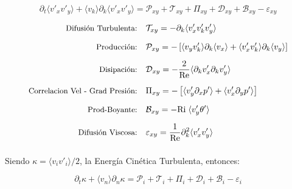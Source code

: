 \newpage 

\begin{equation}
\partial_t \langle v'_x v'_y \rangle + \langle v_k \rangle \partial_k \langle v'_x v'_y \rangle = \mathcal{P}_{xy} + \mathcal{T}_{xy} + \Pi_{xy} + \mathcal{D}_{xy} + \mathcal{B}_{xy} - \varepsilon_{xy}
\end{equation}

\vspace*{-1cm}

\begin{equation}
\begin{aligned}
\mbox{\small Difusión Turbulenta:}\quad 
& \mathcal{T}_{xy} = - \partial_k \langle v'_x v'_k v'_y \rangle \\[2mm]
\mbox{\small Producción:}\quad 
& \mathcal{P}_{xy} = - \left[ \langle v_y v'_k \rangle \partial_k \langle v_x \rangle + \langle v'_x v'_k \rangle \partial_k \langle v_y \rangle \right]  \\[2mm]
\mbox{\small Disipación:}\quad 
& \mathcal{D}_{xy} = - \frac{2}{\text{Re}} \langle \partial_k v'_x \partial_k v'_y \rangle \\[2mm]
\mbox{\small Correlacion Vel - Grad Presión:}\quad 
& \Pi_{xy} = - \left[ \langle v'_y \partial_x p' \rangle + \langle v'_x \partial_y p' \rangle \right]  \\[2mm]
\mbox{\small Prod-Boyante:}\quad 
& \mathcal{B}_{xy} = - \text{Ri} \hspace{1mm} \langle v'_y \theta' \rangle \\[2mm]
\mbox{\small Difusión Viscosa:}\quad 
& \varepsilon_{xy} = \frac{1}{\text{Re}} \partial^2_k \langle v'_x v'_y \rangle \\[2mm]
\end{aligned}
\end{equation}


Siendo $\kappa = \langle v_i v'_i \rangle / 2$, la Energía Cinética Turbulenta, entonces:

\begin{equation}
\partial_t \kappa + \langle v_n \rangle \partial_n \kappa = \mathcal{P}_{i} + \mathcal{T}_{i} + \Pi_{i} + \mathcal{D}_{i} + \mathcal{B}_{i} - \varepsilon_{i}
\end{equation}

\vspace*{-0.5cm}

